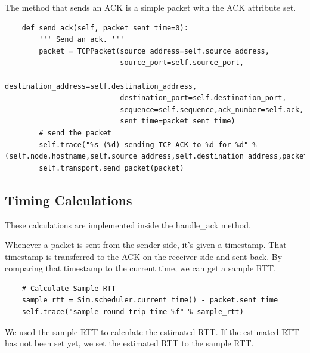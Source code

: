 \documentclass[11pt]{article}
\begin{document}
\vspace{5mm}

The method that sends an ACK is a simple packet with the ACK attribute set.

\vspace{5mm}

\begin{lstlisting}
    def send_ack(self, packet_sent_time=0):
        ''' Send an ack. '''
        packet = TCPPacket(source_address=self.source_address,
                           source_port=self.source_port,
                           destination_address=self.destination_address,
                           destination_port=self.destination_port,
                           sequence=self.sequence,ack_number=self.ack,
                           sent_time=packet_sent_time)
        # send the packet
        self.trace("%s (%d) sending TCP ACK to %d for %d" % (self.node.hostname,self.source_address,self.destination_address,packet.ack_number))
        self.transport.send_packet(packet)
\end{lstlisting}

\vspace{5mm}

\subsection{Timing Calculations}

These calculations are implemented inside the handle_ack method.

\vspace{5mm}

Whenever a packet is sent from the sender side, it's given a timestamp. That timestamp is transferred to the ACK on the receiver side and sent back. By comparing that timestamp to the current time, we can get a sample RTT.

\vspace{5mm}

\begin{lstlisting}
    # Calculate Sample RTT
    sample_rtt = Sim.scheduler.current_time() - packet.sent_time
    self.trace("sample round trip time %f" % sample_rtt)
\end{lstlisting}

\vspace{5mm}

We used the sample RTT to calculate the estimated RTT. If the estimated RTT has not been set yet, we set the estimated RTT to the sample RTT.
\end{document}

